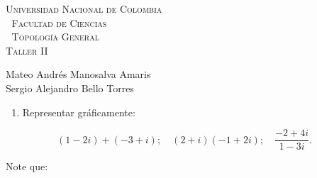 \documentclass[11pt]{article}
\begin{document}
\setlength{\parindent}{0cm}
\hoffset-0.46cm
\voffset-1.46cm
\begin{window}
\large\scshape \hspace{1.4cm}\textsf{Universidad Nacional de Colombia} \\
\textcolor{white}{\tiny.}  \large \hspace{2.4cm} \textsf{Facultad de Ciencias} \\
\textcolor{white}{\tiny.}   \normalsize\hspace{2.8cm}\textsf{Topología General}\\
\hspace*{3.9cm}\textsf{Taller II}\\
\end{window}
\vspace{0.8cm}
\textsf{Mateo Andrés Manosalva Amaris\\
Sergio Alejandro Bello Torres} 
\normalsize
\dotfill
\vspace{0.7cm}


\begin{enumerate}
  \item Representar gráficamente:
\end{enumerate}

$$
(1-2 i)+(-3+i) ; \quad(2+i)(-1+2 i) ; \quad \frac{-2+4 i}{1-3 i}.
$$

Note que:
\end{document}
